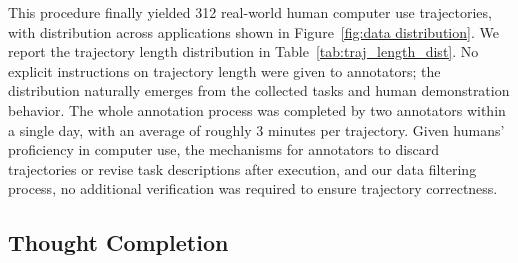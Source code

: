 \documentclass{article} %
\begin{document}
This procedure finally yielded 312 real-world human computer use trajectories, with distribution across applications shown in Figure~\ref{fig:data distribution}. We report the trajectory length distribution in Table~\ref{tab:traj_length_dist}. No explicit instructions on trajectory length were given to annotators; the distribution naturally emerges from the collected tasks and human demonstration behavior. The whole annotation process was completed by two annotators within a single day, with an average of roughly 3 minutes per trajectory. Given humans' proficiency in computer use, the mechanisms for annotators to discard trajectories or revise task descriptions after execution, and our data filtering process, no additional verification was required to ensure trajectory correctness.

\begin{table}
\centering
\small
{}
\caption{Unified action space $\mathcal{A}$.}
\label{tab:action-space}
\end{table}


\subsection{Thought Completion}
\label{sec: thought completion}
\end{document}
